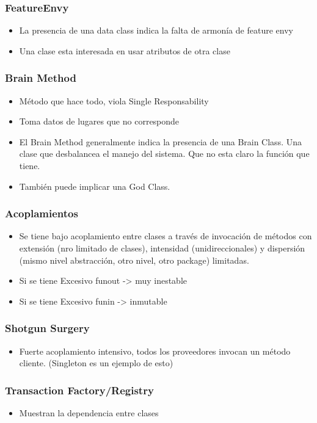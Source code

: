 \subsubsection*{FeatureEnvy}

\begin{itemize}
\item La presencia de una data class indica la falta de armonía de feature envy
\item Una clase esta interesada en usar atributos de otra clase
\end{itemize}

\subsubsection*{Brain Method}

\begin{itemize}
\item Método que hace todo, viola Single Responsability
\item Toma datos de lugares que no corresponde
\item El Brain Method generalmente indica la presencia de una Brain Class. Una clase que desbalancea el manejo del sistema. Que no esta claro la función que tiene.
\item También puede implicar una God Class.
\end{itemize}


\subsubsection*{Acoplamientos}
\begin{itemize}
\item Se tiene bajo acoplamiento entre clases a través de invocación de métodos con extensión (nro limitado de clases), intensidad (unidireccionales) y dispersión (mismo nivel abstracción, otro nivel, otro package) limitadas.
\item Si se tiene Excesivo funout -> muy inestable
\item Si se tiene Excesivo funin -> inmutable
\end{itemize}



\subsubsection*{Shotgun Surgery}

\begin{itemize}
\item Fuerte acoplamiento intensivo, todos los proveedores invocan un método cliente. (Singleton es un ejemplo de esto)
\end{itemize}

\subsubsection*{Transaction Factory/Registry}

\begin{itemize}
\item Muestran la dependencia entre clases
\end{itemize}



